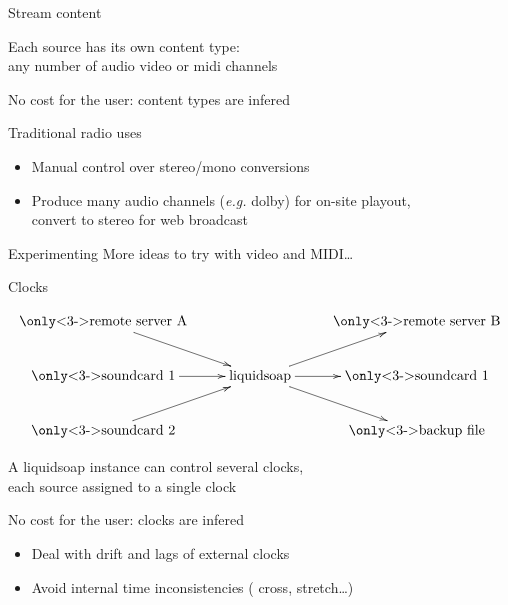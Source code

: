 \documentclass{beamer}
\newcommand{\kw}[1]{{\color{red} #1}}
\renewcommand{\textbf}[1]{{\color{blue} #1}}
\begin{document}
\begin{frame}{Stream content}

\begin{center}
\large
  Each source has its own content type: \\
  any number of \textbf{audio video or midi} channels
\begin{flushright}
\small \color{gray} No cost for the user: content types are infered
\end{flushright}
\end{center}

\begin{block}{Traditional radio uses}
\begin{itemize}
\item Manual control over stereo/mono conversions
\item Produce many audio channels ({\em e.g.} dolby) for on-site playout, \\
  convert to stereo for web broadcast
\end{itemize}
\end{block}

\begin{block}{Experimenting}
More ideas to try with video and MIDI\ldots
\end{block}

\end{frame}


\begin{frame}{Clocks}

\[
\xymatrix{
  \text{\only<3->{\color{red}}remote server A} \ar[dr] &
        & \mbox{\only<3->{\color{gray}}remote server B} \\
  \text{\only<3->{\color{blue}}soundcard 1} \ar[r]      &
                \text{liquidsoap} \ar[ur]\ar[r]\ar[dr]
        & \mbox{\only<3->{\color{blue}}soundcard 1}     \\
  \text{\only<3->{\color{green}}soundcard 2} \ar[ur] &
        & \mbox{\only<3->{\color{blue}}backup file}
}
\]

\vspace{0.5cm}
\pause

\begin{center}
\large
  A liquidsoap instance can control several clocks, \\
  each source assigned to a single clock
\begin{flushright}
\small \color{gray} No cost for the user: clocks are infered
\end{flushright}
\end{center}

\pause
\pause

\begin{itemize}
\item Deal with drift and lags of external clocks
\item Avoid internal time inconsistencies (\kw{cross}, \kw{stretch}\ldots)
\end{itemize}

\end{frame}
\end{document}
